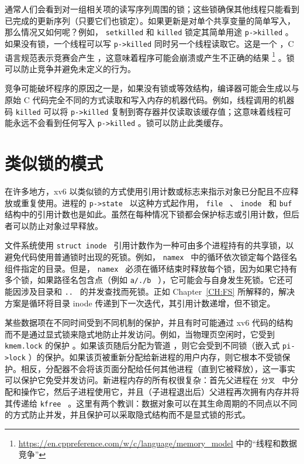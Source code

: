 通常人们会看到对一组相关项的读写序列周围的锁；这些锁确保其他线程只能看到已完成的更新序列（只要它们也锁定）。如果更新是对单个共享变量的简单写入，那么情况又如何呢？例如，
    \texttt{setkilled}    和    \texttt{killed}   
        锁定其简单用途
    \lstinline{p->killed}    。如果没有锁，一个线程可以写
    \lstinline{p->killed}    同时另一个线程读取它。这是一个        ，C 语言规范表示竞赛会产生        ，这意味着程序可能会崩溃或产生不正确的结果    \footnote{   \url{https://en.cppreference.com/w/c/language/memory_model}    中的“线程和数据竞争”  }    。锁可以防止竞争并避免未定义的行为。  

竞争可能破坏程序的原因之一是，如果没有锁或等效结构，编译器可能会生成以与原始 C 代码完全不同的方式读取和写入内存的机器代码。例如，线程调用的机器码
    \texttt{killed}    可以将    \lstinline{p->killed}    复制到寄存器并仅读取该缓存值；这意味着线程可能永远不会看到任何写入
    \lstinline{p->killed}    。锁可以防止此类缓存。  

   \section{类似锁的模式  }     

在许多地方，xv6 以类似锁的方式使用引用计数或标志来指示对象已分配且不应释放或重复使用。进程的  {    \tt    p->state   }  以这种方式起作用， {    \tt    file   }  、  {    \tt    inode   }  和  {    \tt    buf   }  结构中的引用计数也是如此。虽然在每种情况下锁都会保护标志或引用计数，但后者可以防止对象过早释放。  

文件系统使用 {    \tt    struct inode   } 引用计数作为一种可由多个进程持有的共享锁，以避免代码使用普通锁时出现的死锁。例如， {    \tt    namex   }         中的循环依次锁定每个路径名组件指定的目录。但是，  {    \tt    namex   }  必须在循环结束时释放每个锁，因为如果它持有多个锁，如果路径名包含点（例如  {    \tt    a/./b   }  ），它可能会与自身发生死锁。它还可能因涉及目录和  {    \tt    ..   }  的并发查找而死锁。正如 Chapter~\ref{CH:FS}    所解释的，解决方案是循环将目录 inode 传递到下一次迭代，其引用计数递增，但不锁定。  

某些数据项在不同时间受到不同机制的保护，并且有时可能通过 xv6 代码的结构而不是通过显式锁来隐式地防止并发访问。例如，当物理页空闲时，它受到    \texttt{kmem.lock}    的保护
    。如果该页随后分配为管道        ，则它会受到不同锁（嵌入式    \lstinline{pi->lock}    ）的保护。如果该页被重新分配给新进程的用户内存，则它根本不受锁保护。相反，分配器不会将该页面分配给任何其他进程（直到它被释放），这一事实可以保护它免受并发访问。新进程内存的所有权很复杂：首先父进程在  {    \tt    分叉   }  中分配和操作它，然后子进程使用它，并且（子进程退出后）父进程再次拥有内存并将其传递给  {    \tt    kfree   }  。这里有两个教训：数据对象可以在其生命周期的不同点以不同的方式防止并发，并且保护可以采取隐式结构而不是显式锁的形式。  

